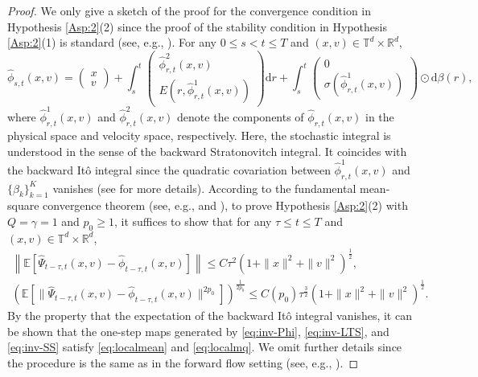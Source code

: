 \documentclass[11pt,reqno]{amsproc}
\newcommand{\ud}{\mathrm d}
\newcommand{\R}{\mathbb{R}}
\numberwithin{equation}{section}
\newcommand{\E}{\mathbb{E}}\allowdisplaybreaks[4]
\begin{document}
\begin{proof}
We only give a sketch of the proof for the convergence condition in Hypothesis \ref{Asp:2}(2) since the proof of the stability condition in Hypothesis \ref{Asp:2}(1) is standard (see, e.g., \cite[Lemma 1.5]{MT21}).
For any $0\le s< t\le T$ and $(x,v)\in\mathbb{T}^d\times \R^{d}$,
$$\widehat{\phi}_{s,t}(x,v)=\left(\begin{array}{c}x \\v\end{array}\right)+\int_{s}^{t} \left(\begin{array}{c}\widehat{\phi}_{r,t}^2(x,v) \\E(r,\widehat{\phi}_{r,t}^1(x,v))\end{array}\right)\ud r+\int_{s}^{t} \left(\begin{array}{c}0 \\\sigma(\widehat{\phi}_{r,t}^1(x,v))\end{array}\right)\odot\ud \beta(r),$$
where $\widehat{\phi}_{r,t}^1(x,v)$ and $\widehat{\phi}_{r,t}^2(x,v)$ denote the components of $\widehat{\phi}_{r,t}(x,v)$ in the physical space and velocity space, respectively.
Here, the stochastic integral is understood in the sense of the backward Stratonovitch integral. It coincides with the backward It\^o integral since the quadratic covariation between $\widehat{\phi}_{r,t}^1(x,v)$ and $\{\beta_k\}_{k=1}^K$ vanishes (see \cite{PP87} for more details).
According to the fundamental mean-square convergence theorem (see, e.g., \cite[Theorem 1.1.1]{MT21} and \cite[Theorem 2.1]{TZ13}), 
to prove Hypothesis \ref{Asp:2}(2) with $Q=\gamma=1$ and $p_0\ge1$,
it suffices to show that  for any $\tau\le t\le T$ and $(x,v)\in\mathbb{T}^d\times \R^{d}$,
\begin{gather}\label{eq:localmean}
\left\|\E\left[\widehat{\Psi}_{t-\tau,t}(x,v)-\widehat{\phi}_{t-\tau,t}(x,v)\right]\right\|\le C\tau^2(1+\|x\|^2+\|v\|^2)^{\frac12},\\\label{eq:localmq}
\left(\E\left[\|\widehat{\Psi}_{t-\tau,t}(x,v)-\widehat{\phi}_{t-\tau,t}(x,v)\|^{2p_0}\right]\right)^{\frac{1}{2p_0}}\le C(p_0)\tau^{\frac32}(1+\|x\|^2+\|v\|^{2})^{\frac{1}{2}}.
\end{gather}
By the property that the expectation of the backward It\^o integral vanishes, it can be shown that the one-step maps generated by \eqref{eq:inv-Phi}, \eqref{eq:inv-LTS}, and \eqref{eq:inv-SS}
satisfy \eqref{eq:localmean} and \eqref{eq:localmq}. We omit further details since the procedure is the same as in the forward flow setting 
(see, e.g., \cite[Theorem 4]{CCDL20}).
\end{proof}
\end{document}
